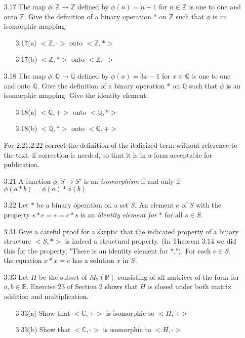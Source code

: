 \documentclass[12pt]{article}
\newcommand{\Z}{\mathds{Z}}
\newcommand{\C}{\mathbb{C}}
\newcommand{\R}{\mathbb{R}}
\newcommand{\Q}{\mathbb{Q}}
\begin{document}
\begin{enumerate}
\begin{enumerate}
			\item[3.17] The map $\phi: \Z \rightarrow \Z$ defined by $\phi(n)=n+1$ for $n \in \Z$ is one to one and onto $\Z$. Give the definition of a binary operation $\ast$ on $\Z$ such that $\phi$ is an isomorphic mapping.
			\begin{enumerate}
				\item[3.17(a)]
				$<\Z,\cdot>$ onto $<\Z,\ast>$
				\item[3.17(b)]
				$<\Z,\ast>$ onto $<\Z,\cdot>$
			\end{enumerate}
			
			\item[3.18] The map $\phi: \Q \rightarrow \Q$ defined by $\phi(x)=3x-1$ for $x \in \Q$ is one to one and onto $\Q$. Give the definition of a binary operation $\ast$ on $\Q$ such that $\phi$ is an isomorphic mapping. Give the identity element.
			\begin{enumerate}
				\item[3.18(a)]
				$<\Q,+>$ onto $<\Q,\ast>$
				\item[3.18(b)]
				$<\Q,\ast>$ onto $<\Q,+>$
				
			\end{enumerate}
			
			
			For 2.21,2.22 correct the definition of the italicized term without  reference to the text, if correction is needed, so that it is in a form acceptable for publication.
			
			\item[3.21] A function $\phi:S \rightarrow S'$ is an \textit{isomorphism} if and only if $\phi(a\ast b) = \phi(a) \ast \phi(b)$
			
			\item[3.22] Let $\ast$ be a binary operation on a set $S$. An element $e$ of $S$ with the property $s \ast e = s = e  \ast s$ is an \textit{identity element for} $\ast$ for all $s \in S$.
			
			\item[3.31] Give a careful proof for a skeptic that the indicated property of a binary structure $<S,\ast>$ is indeed a structural property. (In Theorem 3.14 we did this for the property, "There is an identity element for $\ast$."). For each $c \in S$, the equation $x \ast x = c$ has a solution $x$ in $S$.
			
			\item[3.33] Let $H$ be the subset of $M_2(\R)$ consisting of all matrices of the form for $a,b \in \R$. Exercise 23 of Section 2 shows that $H$ is closed under both matrix addition and multiplication.
			
			\begin{enumerate}
				\item[3.33(a)] Show that $<\C,+>$ is isomorphic to $<H,+>$ 
				\item[3.33(b)] Show that $<\C,\cdot>$ is isomorphic to $<H,\cdot>$
			\end{enumerate}
		\end{enumerate}
		
		
	\end{enumerate}
\end{document}
